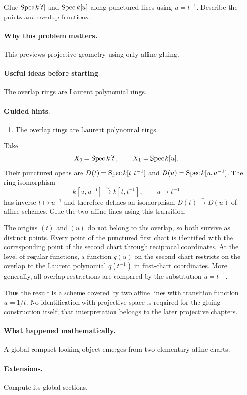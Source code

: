 \begin{problem}\label{prob:vi20-p08}
Glue $\operatorname{Spec} k[t]$ and $\operatorname{Spec} k[u]$ along punctured lines using $u=t^{-1}$. Describe the points and overlap functions.
\end{problem}

\ifdefined\FullProblemDossiers
\paragraph{Why this problem matters.}
This previews projective geometry using only affine gluing.

\paragraph{Useful ideas before starting.}
The overlap rings are Laurent polynomial rings.

\paragraph{Guided hints.}
\begin{enumerate}
\item The overlap rings are Laurent polynomial rings.
\end{enumerate}

\begin{solution}
Take
\[
X_0=\operatorname{Spec} k[t],\qquad X_1=\operatorname{Spec} k[u].
\]
Their punctured opens are $D(t)=\operatorname{Spec} k[t,t^{-1}]$ and $D(u)=\operatorname{Spec} k[u,u^{-1}]$.  The ring isomorphism
\[
k[u,u^{-1}]\xrightarrow{\sim}k[t,t^{-1}],\qquad u\longmapsto t^{-1}
\]
has inverse $t\mapsto u^{-1}$ and therefore defines an isomorphism $D(t)\xrightarrow{\sim}D(u)$ of affine schemes.  Glue the two affine lines using this transition.

The origins $(t)$ and $(u)$ do not belong to the overlap, so both survive as distinct points.  Every point of the punctured first chart is identified with the corresponding point of the second chart through reciprocal coordinates.  At the level of regular functions, a function $q(u)$ on the second chart restricts on the overlap to the Laurent polynomial $q(t^{-1})$ in first-chart coordinates.  More generally, all overlap restrictions are compared by the substitution $u=t^{-1}$.

Thus the result is a scheme covered by two affine lines with transition function $u=1/t$.  No identification with projective space is required for the gluing construction itself; that interpretation belongs to the later projective chapters.
\end{solution}


\paragraph{What happened mathematically.}
A global compact-looking object emerges from two elementary affine charts.

\paragraph{Extensions.}
Compute its global sections.
\fi
